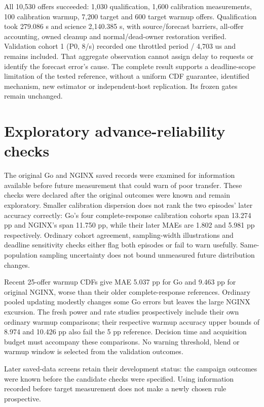 \documentclass[11pt,a4paper]{article}
\begin{document}
All 10,530 offers succeeded: 1,030 qualification, 1,600 calibration measurements,
100 calibration warmup, 7,200 target and 600 target warmup offers. Qualification
took 279.086 s and science 2,140.385 s, with source/forecast barriers, all-offer
accounting, owned cleanup and normal/dead-owner restoration verified. Validation
cohort 1 (P0, 8/s) recorded one throttled period / 4,703 us and remains included.
That aggregate observation cannot assign delay to requests or identify the
forecast error's cause. The complete result supports a deadline-scope limitation
of the tested reference, without a uniform CDF guarantee, identified mechanism,
new estimator or independent-host replication. Its frozen gates remain unchanged.

\section{Exploratory advance-reliability checks}

The original Go and NGINX saved records were examined for information available
before future measurement that could warn of poor transfer. These checks were
declared after the original outcomes were known and remain exploratory. Smaller
calibration dispersion does not rank the two episodes' later accuracy correctly:
Go's four complete-response calibration cohorts span 13.274 pp and NGINX's
span 11.750 pp, while their later MAEs are 1.802 and 5.981 pp respectively.
Ordinary cohort agreement, sampling-width illustrations and deadline sensitivity
checks either flag both episodes or fail to warn usefully. Same-population
sampling uncertainty does not bound unmeasured future distribution changes.

Recent 25-offer warmup CDFs give MAE 5.037 pp for Go and 9.463 pp for original
NGINX, worse than their older complete-response references. Ordinary pooled
updating modestly changes some Go errors but leaves the large NGINX excursion.
The fresh power and rate studies prospectively include their own ordinary
warmup comparisons; their respective warmup accuracy upper bounds of 8.974
and 10.426 pp also fail the 5 pp reference. Decision time and acquisition budget
must accompany these comparisons. No warning threshold, blend or warmup window
is selected from the validation outcomes.

Later saved-data screens retain their development status: the campaign outcomes
were known before the candidate checks were specified. Using information recorded
before target measurement does not make a newly chosen rule prospective.
\end{document}
